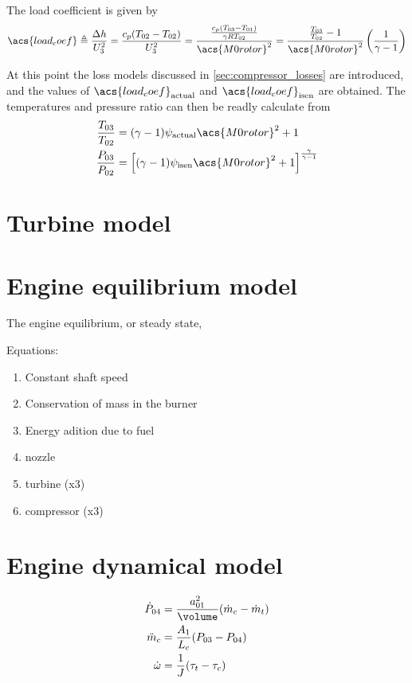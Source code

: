 \documentclass[tcc]{subfiles}
\begin{document}
The load coefficient is given by
\begin{equation}
    \acs{load_coef}\triangleq \frac{\Delta h}{U_3^2}
                      = \frac{c_p(T_{02}-T_{02})}{U_3^2}
                      = \frac{\frac{c_p(T_{03}-T_{01})}{\gamma R T_{02}}}
                                    {\acs{M0rotor}^2}
                      = \frac{\frac{T_{03}}{T_{02}}-1}
                                  {\acs{M0rotor}^2}
                        \left(\frac{1}{\gamma-1}\right)
\end{equation}

At this point the loss models discussed in \cref{sec:compressor_losses} are introduced, 
and the values of $\acs{load_coef}_{\text{actual}}$ and $\acs{load_coef}_{\text{isen}}$ are obtained.
The temperatures and pressure ratio can then be readly calculate from
\begin{align}
    \label{eqn:psi2Tratio}
    \frac{T_{03}}{T_{02}} &= (\gamma - 1)\psi_{\text{actual}} \acs{M0rotor}^2 + 1 \\
    \label{eqn:psi2Pratio}
    \frac{P_{03}}{P_{02}} &= \left[(\gamma - 1)\psi_{\text{isen}} \acs{M0rotor}^2 + 1\right]^\frac{\gamma}{\gamma-1}
\end{align}


\section{Turbine model}




\section{Engine equilibrium model}


The engine equilibrium, or steady state, 


Equations:
\begin{enumerate}
    \item Constant shaft speed
    \item Conservation of mass in the burner
    \item Energy adition due to fuel
    \item nozzle
    \item turbine (x3)
    \item compressor (x3)
\end{enumerate}

\section{Engine dynamical model}
\begin{align}
    \dot{P}_{04} &= \frac{a_{01}^2}{\volume}(\dot{m}_c - \dot{m}_t) \\
    \ddot{m}_c &= \frac{A_1}{L_c}(P_{03}-P_{04}) \\
    \dot{\omega} &= \frac{1}{J} (\tau_t-\tau_c)
\end{align}
\end{document}
